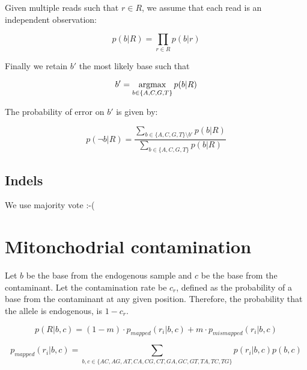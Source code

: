 \documentclass[a4paper,12pt]{article}
\newcommand{\argmax}{\operatornamewithlimits{argmax}}
\begin{document}
Given multiple reads such that $r \in R$, we assume that each read is an independent observation:

\begin{equation}
p(b|R) = \prod_{r \in R} p(b|r)
\end{equation} 

Finally we retain $b'$ the most likely base such that 

\begin{equation}
 b' = \argmax_{b \in \{A,C,G,T\} }   p(b|R)
\end{equation} 


The probability of error on $b'$ is given by:

\begin{equation}
p(\neg b|R) = \frac { \sum_{ b \in \{A,C,G,T\}  \setminus b' } p(b|R) } { \sum_{ b \in \{A,C,G,T\}  } p(b|R) }
\label{errormt}
\end{equation}
 



\subsection{Indels}


We use majority vote :-(




\section{Mitonchodrial contamination}

Let $b$ be the base from the endogenous sample and $c$ be the base from the contaminant. Let the contamination rate be $c_r$, defined as the probability of a base from the contaminant at any given position. Therefore, the probability that the allele is endogenous, is $1-c_r$.

\begin{equation}
p(R|b,c)  = (1-m) \cdot p_{mapped}(r_i|b,c) + m \cdot p_{mismapped}(r_i|b,c)  %
\end{equation}

\begin{equation}
p_{mapped}(r_i|b,c) = \sum_{ b,c \in \{AC,AG,AT,CA,CG,CT,GA,GC,GT,TA,TC,TG\} } p(r_i|b,c) p(b,c)
\end{equation}
\end{document}
